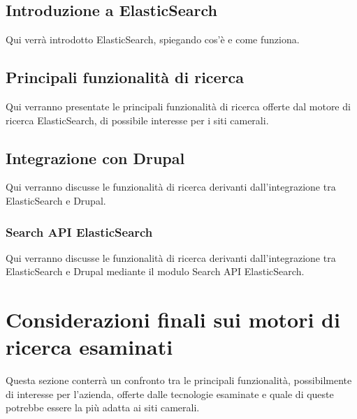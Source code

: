 		\subsection{Introduzione a ElasticSearch}
		Qui verrà introdotto ElasticSearch, spiegando cos'è e come funziona.

		\subsection{Principali funzionalità di ricerca}
		Qui verranno presentate le principali funzionalità di ricerca offerte dal motore di ricerca ElasticSearch, di possibile interesse per i siti camerali.
		
		\subsection{Integrazione con Drupal}
		Qui verranno discusse le funzionalità di ricerca derivanti dall'integrazione tra ElasticSearch e Drupal.
		
			\subsubsection{Search API ElasticSearch}
			Qui verranno discusse le funzionalità di ricerca derivanti dall'integrazione tra ElasticSearch e Drupal mediante il modulo Search API ElasticSearch.
			
	\section{Considerazioni finali sui motori di ricerca esaminati}
	Questa sezione conterrà un confronto tra le principali funzionalità, possibilmente di interesse per l'azienda, offerte dalle tecnologie esaminate e quale di queste potrebbe essere la più adatta ai siti camerali.